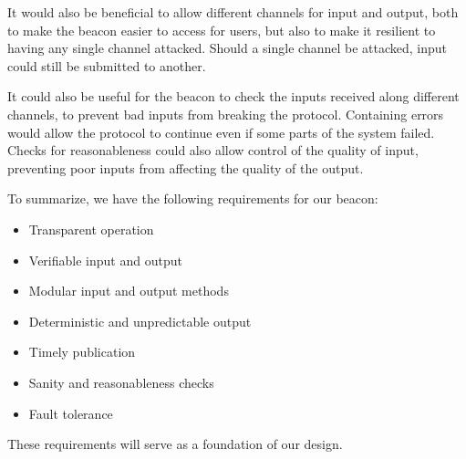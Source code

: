 It would also be beneficial to allow different channels for input and output, both to make the beacon easier to access for users, but also to make it resilient to having any single channel attacked.
Should a single channel be attacked, input could still be submitted to another.

It could also be useful for the beacon to check the inputs received along different channels, to prevent bad inputs from breaking the protocol.
Containing errors would allow the protocol to continue even if some parts of the system failed.
Checks for reasonableness could also allow control of the quality of input, preventing poor inputs from affecting the quality of the output.

To summarize, we have the following requirements for our beacon:

\begin{itemize}
    \setlength\itemsep{0em}
    \item Transparent operation
    \item Verifiable input and output
    \item Modular input and output methods
    \item Deterministic and unpredictable output
    \item Timely publication
    \item Sanity and reasonableness checks
    \item Fault tolerance
\end{itemize}

These requirements will serve as a foundation of our design.

